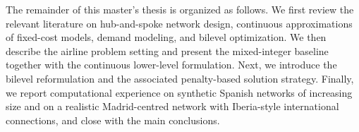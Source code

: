 The remainder of this master's thesis is organized as follows. We first review the relevant literature on hub-and-spoke network design, continuous approximations of fixed-cost models, demand modeling, and bilevel optimization. We then describe the airline problem setting and present the mixed-integer baseline together with the continuous lower-level formulation. Next, we introduce the bilevel reformulation and the associated penalty-based solution strategy. Finally, we report computational experience on synthetic Spanish networks of increasing size and on a realistic Madrid-centred network with Iberia-style international connections, and close with the main conclusions.
